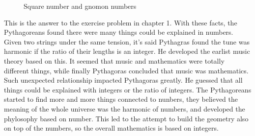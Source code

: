 \documentclass{article}
\begin{document}
\begin{figure}[htbp]
\centering
{}
\caption{Square number and gnomon numbers}
\label{fig:square-num}
\end{figure}

This is the answer to the exercise problem in chapter 1. With these facts, the Pythagoreans found there were many things could be explained in numbers. Given two strings under the same tension, it's said Pythagras found the tune was harmonic if the ratio of their lengths is an integer. He developed the earlist music theory based on this. It seemed that music and mathematics were totally different things, while finally Pythagoras concluded that music was mathematics. Such unexpected relationship impacted Pythagoras greatly. He guessed that all things could be explained with integers or the ratio of integers. The Pythagoreans started to find more and more things connected to nunbers, they believed the meaning of the whole universe was the harmonic of numbers, and developed the phylosophy based on number. This led to the attempt to build the geometry also on top of the numbers, so the overall mathematics is based on integers.
\end{document}

